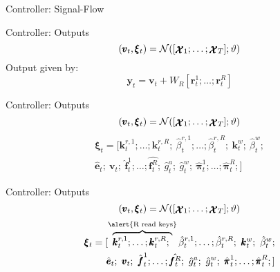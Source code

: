 \documentclass{beamer}
\newcommand{\xx}{\pmb{\raisebox{-1.5pt}{$\mathcal{X}$}}}
\newcommand{\hh}{\pmb{h}}
\begin{document}
\begin{frame}{Controller: Signal-Flow}
\begin{figure}
	\end{figure}
\end{frame}

\begin{frame}{Controller: Outputs}
	\vspace*{\fill}
	\[
	(\pmb{v}_t,\pmb{\xi}_t)=\mathcal{N}([\xx_1;\dots;\xx_T];\vartheta)
	\]
	\pause
	Output given by:
	\[
	\pmb{y}_t = \pmb{v}_t + W_R[\pmb{r}_t^1;\dots;\pmb{r}_t^R] \tag{hello}
	\]
\end{frame}

\begin{frame}{Controller: Outputs}
	\[
	(\pmb{v}_t,\pmb{\xi}_t)=\mathcal{N}([\xx_1;\dots;\xx_T];\vartheta)
	\]
	\vspace{5pt}
	\pause
	\begin{equation*}
	\begin{split}
	\pmb\xi_t = [ \pmb{k}_t^{r,1};\dots;\pmb{k}_t^{r,R};\ 
				\hat{\beta}_t^{r,1};\dots;\hat{\beta}_t^{r,R};\ 
				\pmb{k}_t^w;\ \hat{\beta}_t^w; \\
				\hat{\pmb{e}}_t;\
				\pmb{v}_t;\ \hat{\pmb{f}}_t^1;\dots;\hat{\pmb{f}_t^R};\ 
				\hat{g}_t^a;\ \hat{g}_t^w;\ \hat{\pmb{\pi}}_t^1;\dots;\hat{\pmb{\pi}}_t^R;]					
	\end{split}
	\end{equation*}
\end{frame}

\begin{frame}{Controller: Outputs}
	\[
	(\pmb{v}_t,\pmb{\xi}_t)=\mathcal{N}([\xx_1;\dots;\xx_T];\vartheta)
	\]
	\vspace{5pt}
	\begin{equation*}
	\begin{split}
	\pmb\xi_t = [\overbrace{\pmb{k}_t^{r,1};\dots;\pmb{k}_t^{r,R};\ }^\text{\alert{R read keys}}
				\hat{\beta}_t^{r,1};\dots;\hat{\beta}_t^{r,R};\ 
				\pmb{k}_t^w;\ \hat{\beta}_t^w; \\
				\hat{\pmb{e}}_t;\
				\pmb{v}_t;\ \hat{\pmb{f}}_t^1;\dots;\hat{\pmb{f}_t^R};\ 
				\hat{g}_t^a;\ \hat{g}_t^w;\ \hat{\pmb{\pi}}_t^1;\dots;\hat{\pmb{\pi}}_t^R;]					
	\end{split}
	\end{equation*}

\end{frame}
\end{document}
